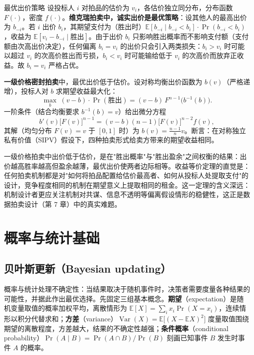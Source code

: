 \begin{derivation}{最优出价策略}{}
设投标人 $i$ 对拍品的估价为 $v_i$，各估价独立同分布，分布函数 $F(\cdot)$，密度 $f(\cdot)$。\textbf{维克瑞拍卖中，诚实出价是最优策略}：设其他人的最高出价为 $b_{-i}$。若 $i$ 出价 $b_i$，其期望支付为（胜出时）$\mathbb{E}[b_{-i} \mid b_{-i} < b_i] \cdot \Pr(b_{-i} < b_i)$，收益为 $\mathbb{E}[v_i - b_{-i} \mid \text{胜出}]$。由于出价 $b_i$ 只影响胜出概率而不影响支付额（支付额由次高出价决定），任何偏离 $b_i = v_i$ 的出价只会引入两类损失：$b_i > v_i$ 时可能以超过 $v_i$ 的次高价胜出而亏损，$b_i < v_i$ 时可能输给低于 $v_i$ 的次高价而放弃正收益。故 $b_i = v_i$ 严格占优。

\textbf{一级价格密封拍卖}中，最优出价低于估价。设对称均衡出价函数为 $b(v)$（严格递增），投标人对 $b$ 求期望收益最大化：
\[
\max_b \; (v - b) \cdot \Pr(\text{胜出}) = (v - b)\, F^{n-1}\bigl(b^{-1}(b)\bigr).
\]
一阶条件（结合均衡要求 $b^{-1}(b) = v$）给出微分方程
\[
b'(v)\bigl[F(v)\bigr]^{n-1} = (v - b)(n-1)\bigl[F(v)\bigr]^{n-2} f(v),
\]
其解（均匀分布 $F(v)=v$ 于 $[0,1]$ 时）为 $b(v) = \frac{n-1}{n} v$。断言：在对称独立私有价值（SIPV）假设下，四种拍卖形式给卖方带来的期望收益相同。
\end{derivation}

一级价格拍卖中出价低于估价，是在"胜出概率"与"胜出盈余"之间权衡的结果：出价越高胜率越高但盈余越薄，最优出价使两者边际相等。收益等价定理的直觉是：任何拍卖机制都是对"如何将拍品配置给估价最高者、如何从投标人处提取支付"的设计，竞争程度相同的机制在期望意义上提取相同的租金。这一定理的含义深远：机制设计者更应关注机制对共谋、信息不透明等偏离假设情形的稳健性，这正是数据拍卖设计（第 7 章）中的真实难题。
\section{概率与统计基础}

\subsection{贝叶斯更新（Bayesian updating）}

概率与统计处理不确定性：当结果取决于随机事件时，决策者需要度量各种结果的可能性，并据此作出最优选择。先固定三组基本概念。\textbf{期望}（expectation）是随机变量取值的概率加权平均，离散情形为 $\mathbb{E}[X] = \sum_i x_i \Pr(X = x_i)$，连续情形以积分代替求和；\textbf{方差}（variance）$\operatorname{Var}(X) = \mathbb{E}\bigl[(X - \mathbb{E}X)^2\bigr]$ 度量取值围绕期望的离散程度，方差越大，结果的不确定性越强；\textbf{条件概率}（conditional probability）$\Pr(A \mid B) = \Pr(A \cap B)/\Pr(B)$ 刻画已知事件 $B$ 发生时事件 $A$ 的概率。

